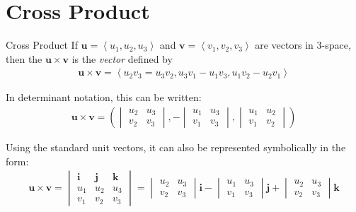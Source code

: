 \documentclass[\main/notes.tex]{subfiles}
\begin{document}
		\section{Cross Product}
			\begin{definition}{Cross Product}
				If $\mathbf{u} = \left\langle u_{1}, u_{2}, u_{3}\right\rangle$ and $\mathbf{v} = \left\langle v_{1}, v_{2}, v_{3}\right\rangle$ are vectors in $3$-space, then the  $\mathbf{u} \times \mathbf{v}$ is the \emph{vector} defined by
				\begin{align*}
					\mathbf{u} \times \mathbf{v} = \left\langle u_{2}v_{3} = u_{3}v_{2}, u_{3}v_{1} - u_{1}v_{3}, u_{1}v_{2} - u_{2}v_{1}\right\rangle 
				\end{align*}

				In determinant notation, this can be written:
				\begin{align*}
					\mathbf{u} \times \mathbf{v} = \left( \begin{vmatrix}
						u_{2} & u_{3}\\
						v_{2} & v_{3}
					\end{vmatrix}, - \begin{vmatrix}
						u_{1} & u_{3}\\
						v_{1} & v_{3}
					\end{vmatrix}, \begin{vmatrix}
						u_{1} & u_{2}\\
						v_{1} & v_{2}
					\end{vmatrix}\right)
				\end{align*}

				Using the standard unit vectors, it can also be represented symbolically in the form:
				\begin{align*}
					\mathbf{u} \times \mathbf{v} = \begin{vmatrix}
						\mathbf{i} & \mathbf{j} & \mathbf{k}\\
						u_{1} & u_{2} & u_{3}\\
						v_{1} & v_{2} & v_{3}
					\end{vmatrix}
					= \begin{vmatrix}
						u_{2} & u_{3}\\
						v_{2} & v_{3}
					\end{vmatrix} \mathbf{i} -
					\begin{vmatrix}
						u_{1} & u_{3}\\
						v_{1} & v_{3}
					\end{vmatrix} \mathbf{j} + 
					\begin{vmatrix}
						u_{2} & u_{3}\\
						v_{2} & v_{3}
					\end{vmatrix} \mathbf{k}
				\end{align*}
			\end{definition}
\end{document}
